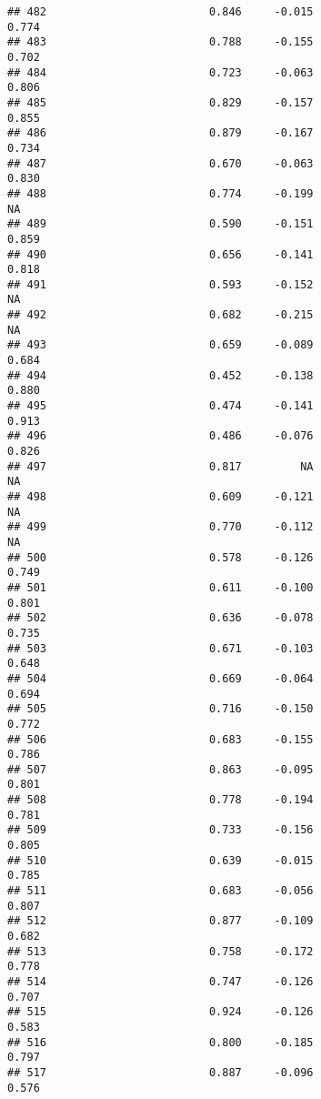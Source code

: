 \documentclass[
]{article}
\begin{document}
\begin{verbatim}
## 482                         0.846     -0.015                     0.774
## 483                         0.788     -0.155                     0.702
## 484                         0.723     -0.063                     0.806
## 485                         0.829     -0.157                     0.855
## 486                         0.879     -0.167                     0.734
## 487                         0.670     -0.063                     0.830
## 488                         0.774     -0.199                        NA
## 489                         0.590     -0.151                     0.859
## 490                         0.656     -0.141                     0.818
## 491                         0.593     -0.152                        NA
## 492                         0.682     -0.215                        NA
## 493                         0.659     -0.089                     0.684
## 494                         0.452     -0.138                     0.880
## 495                         0.474     -0.141                     0.913
## 496                         0.486     -0.076                     0.826
## 497                         0.817         NA                        NA
## 498                         0.609     -0.121                        NA
## 499                         0.770     -0.112                        NA
## 500                         0.578     -0.126                     0.749
## 501                         0.611     -0.100                     0.801
## 502                         0.636     -0.078                     0.735
## 503                         0.671     -0.103                     0.648
## 504                         0.669     -0.064                     0.694
## 505                         0.716     -0.150                     0.772
## 506                         0.683     -0.155                     0.786
## 507                         0.863     -0.095                     0.801
## 508                         0.778     -0.194                     0.781
## 509                         0.733     -0.156                     0.805
## 510                         0.639     -0.015                     0.785
## 511                         0.683     -0.056                     0.807
## 512                         0.877     -0.109                     0.682
## 513                         0.758     -0.172                     0.778
## 514                         0.747     -0.126                     0.707
## 515                         0.924     -0.126                     0.583
## 516                         0.800     -0.185                     0.797
## 517                         0.887     -0.096                     0.576

\end{verbatim}
\end{document}
